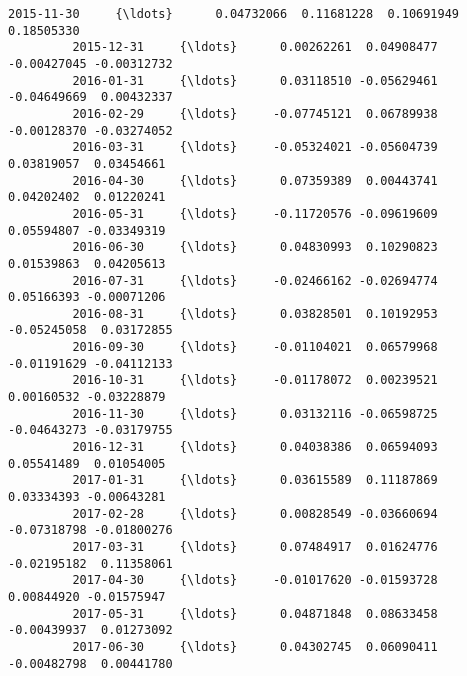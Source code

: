 \documentclass[11pt]{article}
\begin{document}
\begin{Verbatim}[commandchars=\\\{\}]
         2015-11-30     {\ldots}      0.04732066  0.11681228  0.10691949  0.18505330   
         2015-12-31     {\ldots}      0.00262261  0.04908477 -0.00427045 -0.00312732   
         2016-01-31     {\ldots}      0.03118510 -0.05629461 -0.04649669  0.00432337   
         2016-02-29     {\ldots}     -0.07745121  0.06789938 -0.00128370 -0.03274052   
         2016-03-31     {\ldots}     -0.05324021 -0.05604739  0.03819057  0.03454661   
         2016-04-30     {\ldots}      0.07359389  0.00443741  0.04202402  0.01220241   
         2016-05-31     {\ldots}     -0.11720576 -0.09619609  0.05594807 -0.03349319   
         2016-06-30     {\ldots}      0.04830993  0.10290823  0.01539863  0.04205613   
         2016-07-31     {\ldots}     -0.02466162 -0.02694774  0.05166393 -0.00071206   
         2016-08-31     {\ldots}      0.03828501  0.10192953 -0.05245058  0.03172855   
         2016-09-30     {\ldots}     -0.01104021  0.06579968 -0.01191629 -0.04112133   
         2016-10-31     {\ldots}     -0.01178072  0.00239521  0.00160532 -0.03228879   
         2016-11-30     {\ldots}      0.03132116 -0.06598725 -0.04643273 -0.03179755   
         2016-12-31     {\ldots}      0.04038386  0.06594093  0.05541489  0.01054005   
         2017-01-31     {\ldots}      0.03615589  0.11187869  0.03334393 -0.00643281   
         2017-02-28     {\ldots}      0.00828549 -0.03660694 -0.07318798 -0.01800276   
         2017-03-31     {\ldots}      0.07484917  0.01624776 -0.02195182  0.11358061   
         2017-04-30     {\ldots}     -0.01017620 -0.01593728  0.00844920 -0.01575947   
         2017-05-31     {\ldots}      0.04871848  0.08633458 -0.00439937  0.01273092   
         2017-06-30     {\ldots}      0.04302745  0.06090411 -0.00482798  0.00441780   
         

\end{Verbatim}
\end{document}
